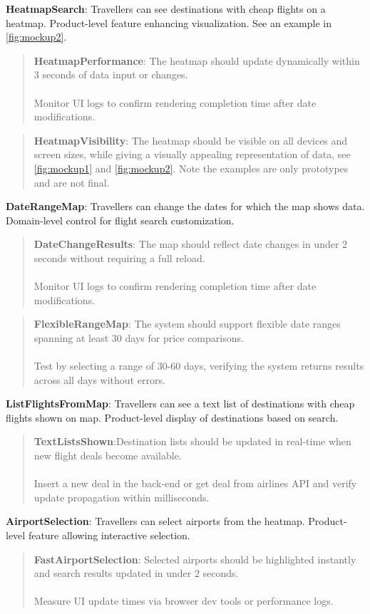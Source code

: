 \textbf{HeatmapSearch}: Travellers can see destinations with cheap flights on a heatmap.
    Product-level feature enhancing visualization. See an example in \autoref{fig:mockup2}.
    \begin{quote}
        \textbf{HeatmapPerformance}: The heatmap should update dynamically within 3 seconds of data input or changes. \\ \\
        Monitor UI logs to confirm rendering completion time after date modifications.
    \end{quote}
    \begin{quote}
        \textbf{HeatmapVisibility}: The heatmap should be visible on all devices and screen sizes, while giving a visually appealing representation of data, see \autoref{fig:mockup1} and \autoref{fig:mockup2}. Note the examples are only prototypes and are not final.
    \end{quote}
\textbf{DateRangeMap}: Travellers can change the dates for which the map shows data. Domain-level control for flight search customization.
    \begin{quote}
        \textbf{DateChangeResults}: The map should reflect date changes in under 2 seconds without requiring a full reload. \\ \\
        Monitor UI logs to confirm rendering completion time after date modifications.
    \end{quote}
\begin{quote}
    \textbf{FlexibleRangeMap}: The system should support flexible date ranges spanning at least 30 days for price comparisons. \\ \\
    Test by selecting a range of 30-60 days, verifying the system returns results across all days without errors.
\end{quote}
\textbf{ListFlightsFromMap}: Travellers can see a text list of destinations with cheap flights shown on map. Product-level display of destinations based on search.
    \begin{quote}
        \textbf{TextListsShown}:Destination lists should be updated in real-time when new flight deals become available. \\ \\
        Insert a new deal in the back-end or get deal from airlines API and verify update propagation within milliseconds.
    \end{quote}
\textbf{AirportSelection}: Travellers can select airports from the heatmap. Product-level feature allowing interactive selection.
\begin{quote}
    \textbf{FastAirportSelection}: Selected airports should be highlighted instantly and search results updated in under 2 seconds. \\ \\ 
    Measure UI update times via browser dev tools or performance logs.
\end{quote}

